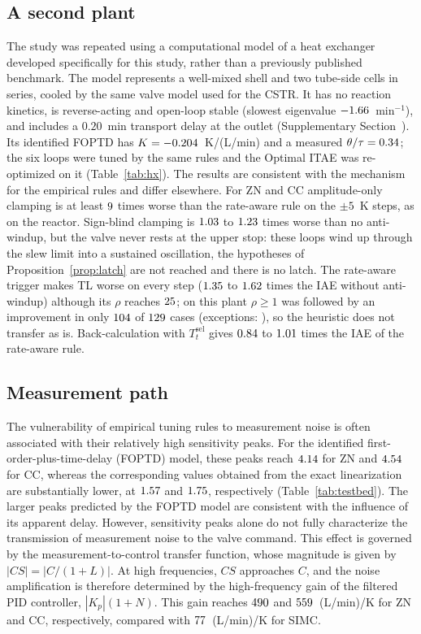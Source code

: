 \subsection{A second plant}
\label{subsec:hx}
The study was repeated using a computational model of a heat exchanger developed specifically for this study, rather than
a previously published benchmark. The model represents a well-mixed shell and two tube-side cells in series, cooled by the same valve model used for the CSTR. It has no reaction
kinetics, is reverse-acting and open-loop stable (slowest eigenvalue $-1.66$~min$^{-1}$), and includes a
$0.20$~min transport delay at the outlet (Supplementary Section~). Its identified FOPTD has $K = -0.204$~K/(L/min) and a measured $\theta/\tau = 0.34$; the six loops were tuned by the same rules and the Optimal ITAE was re-optimized
on it (Table~\ref{tab:hx}). The results are consistent with the mechanism for the empirical rules and differ elsewhere. For ZN and CC amplitude-only clamping is at least $9$ times worse than the rate-aware
rule on the $\pm 5$~K steps, as on the reactor.
Sign-blind clamping is $1.03$ to
$1.23$ times worse than no anti-windup, but the valve never rests at the upper stop: these loops wind up through the slew limit into a sustained oscillation, the hypotheses of Proposition~\ref{prop:latch} are not reached and there is no latch. The rate-aware trigger makes TL worse on every step ($1.35$ to $1.62$ times the IAE without anti-windup) although its $\rho$ reaches $25$; on this plant $\rho \ge 1$ was followed by an improvement in only $104$ of $129$ cases (exceptions: \vhxbadloops{}), so the heuristic does not transfer as is. Back-calculation with $T_t^{\mathrm{sel}}$ gives $0.84$ to $1.01$ times the IAE of the rate-aware rule.



\subsection{Measurement path}
\label{subsec:measurement_path}
The vulnerability of empirical tuning rules to measurement noise is often associated with their relatively high sensitivity peaks. For the identified first-order-plus-time-delay (FOPTD) model, these peaks reach $4.14$ for ZN and $4.54$ for CC, whereas the corresponding values obtained from the exact linearization are substantially lower, at $1.57$ and $1.75$, respectively (Table~\ref{tab:testbed}). The larger peaks predicted by the FOPTD model are consistent with the influence of its apparent delay. However, sensitivity peaks alone do not fully characterize the transmission of measurement noise to the valve command. This effect is governed by the measurement-to-control transfer function, whose magnitude is given by $|CS| = |C/(1+L)|$. At high frequencies, $CS$ approaches $C$, and the noise amplification is therefore determined by the high-frequency gain of the filtered PID controller, $|K_p|(1+N)$. This gain reaches $490$ and $559$~(L/min)/K for ZN and CC, respectively, compared with $77$~(L/min)/K for SIMC.


